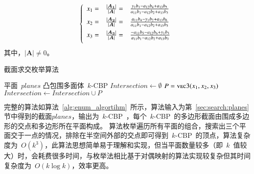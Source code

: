 \begin{equation}
  \label{equa:solution:three-planes}
  \left\{
    \begin{array}{lll}
      x_1 =& \frac{|\bm{A_1}|}{|\bm{A}|} =&\frac{y_1b_1-a_{12}b_4+a_{13}b_5}{a_{11}b_1-a_{12}b_2+a_{13}b_3} 
      \vspace{0.5em}\\ \vspace{0.5em}
      x_2 =& \frac{|\bm{A_2}|}{|\bm{A}|} =&\frac{a_{11}b_4-y_{1}b_2+a_{13}b_6}{a_{11}b_1-a_{12}b_2+a_{13}b_3} 
      \\ \vspace{0.5em}
      x_3 =& \frac{|\bm{A_3}|}{|\bm{A}|} =&\frac{-a_{11}b_5-a_{12}b_6+y_{1}b_3}{a_{11}b_1-a_{12}b_2+a_{13}b_3}
    \end{array}
  \right.
\end{equation}其中，$|\bm{A}| \not= 0$。


\begin{algorithm}[htbp]
\small
\caption{截面求交枚举算法}
\label{alg:enum_algortihm}
\begin{algorithmic}[1]
\Require
平面~$planes$
\Ensure
凸包围多面体~$k$-CBP
    \State $Intersection \gets \emptyset $
                      \State $P = \Call{vec3}{x_1, x_2, x_3}$
                        \State {}
                        \State $Intersection \gets Intersection \cup P$
                      \EndIf
                  \EndIf
              \EndIf
          \EndFor
     \EndFor
     \EndIf
  \EndFor
  \State {}
\EndFunction
\end{algorithmic}
\end{algorithm}

完整的算法如算法~\ref{alg:enum_algortihm}~所示，算法输入为第~\ref{sec:search:planes}节中得到的截面$planes$，输出为~$k$-CBP~，每个~$k$-CBP~的多边形截面由围成多边形的交点和多边形所在平面构成。
算法枚举遍历所有平面的组合，搜索出三个平面交于一点的情况，排除在半空间外部的交点即可得到~$k$-CBP~的顶点，算法复杂度为~$O(k^3)$，此算法思想简单易于理解和实现，但当平面数量较多（即~$k$~值较大）时，会耗费很多时间，与枚举法相比基于对偶映射的算法实现较复杂但其时间复杂度为~$O(k \log k)$，效率更高。

